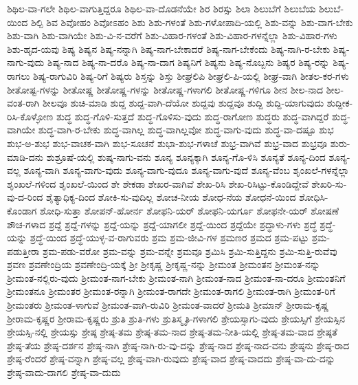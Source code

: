 {ಶಿಥಿಲ-ವಾ-ಗಲೇ
ಶಿಥಿಲ-ವಾಗುತ್ತಿದ್ದರೂ
ಶಿಥಿಲ-ವಾ-ದೊಡನೆಯೇ
ಶಿರ
ಶಿರಸ್ಸು
ಶಿಲಾ
ಶಿಲುಬೆಗೆ
ಶಿಲುಬೆಯ
ಶಿಲುಬೆ-ಯಿಂದ
ಶಿಲ್ಪಿ
ಶಿವ
ಶಿವೋಹಂ
ಶಿವೋಽಹಂ
ಶಿಶು
ಶಿಶು-ಗಳಂತೆ
ಶಿಶು-ಗಳೋಪಾದಿ-ಯಲ್ಲಿ
ಶಿಶು-ವನ್ನು
ಶಿಶು-ವಾಗ-ಬೇಕು
ಶಿಶು-ವಾಗಿ
ಶಿಶು-ವಾಗಿಯೇ
ಶಿಶು-ವಿ-ನ-ವರೆಗೆ
ಶಿಶು-ವಿಹಾರ-ಗಳಂತೆ
ಶಿಶು-ವಿಹಾರ-ಗಳನ್ನೆಲ್ಲಾ
ಶಿಶು-ವಿಹಾರ-ಗಳು
ಶಿಶು-ಹೃದ-ಯವು
ಶಿಷ್ಯ
ಶಿಷ್ಯನ
ಶಿಷ್ಯ-ನನ್ನಾಗಿ
ಶಿಷ್ಯ-ನಾಗ-ಬೇಕಾದರೆ
ಶಿಷ್ಯ-ನಾಗ-ಬೇಕೆಂದು
ಶಿಷ್ಯ-ನಾಗಿ-ರ-ಬೇಕು
ಶಿಷ್ಯ-ನಾಗು-ವುದು
ಶಿಷ್ಯ-ನಾದ
ಶಿಷ್ಯ-ನಾ-ದರೊ
ಶಿಷ್ಯ-ನಾ-ದಾಗ
ಶಿಷ್ಯನಿಗೆ
ಶಿಷ್ಯನು
ಶಿಷ್ಯ-ನೊಬ್ಬನು
ಶಿಷ್ಯರ
ಶಿಷ್ಯ-ರನ್ನು
ಶಿಷ್ಯ-ರಾಗಲು
ಶಿಷ್ಯ-ರಾಗುವಿರಿ
ಶಿಷ್ಯ-ರಿಗೆ
ಶಿಷ್ಯರು
ಶಿಸ್ತನ್ನು
ಶಿಸ್ತು
ಶೀಘ್ರಲಿಪಿ
ಶೀಘ್ರಲಿ-ಪಿ-ಯಲ್ಲಿ
ಶೀಘ್ರ-ವಾಗಿ
ಶೀತಲ-ಕರ-ಗಳು
ಶೀತೋಷ್ಟ-ಗಳನ್ನು
ಶೀತೋಷ್ಣ
ಶೀತೋಷ್ಣ-ಗಳನ್ನು
ಶೀತೋಷ್ಣ-ಗಳಾಗಲಿ
ಶೀತೋಷ್ಣ-ಗಳಿಗೂ
ಶೀನ
ಶೀಲ-ನಾದ
ಶೀಲ-ವಂತ-ರಾಗಿ
ಶೀಲವೂ
ಶುಚಿ-ಮಾಡಿ
ಶುದ್ದ
ಶುದ್ದ-ವಾಗಿ-ದೆಯೋ
ಶುದ್ದವು
ಶುದ್ದವೂ
ಶುದ್ದಿ
ಶುದ್ದಿ-ಯಾಗುವುದು
ಶುದ್ದೀಕ-ರಿಸಿ-ಕೊಳ್ಳೋಣ
ಶುದ್ಧ
ಶುದ್ಧ-ಗೊಳಿ-ಸುತ್ತದೆ
ಶುದ್ಧ-ಗೊಳಿಸು-ವುದು
ಶುದ್ಧ-ರಾಗೋಣ
ಶುದ್ಧರು
ಶುದ್ಧ-ವಾಗಿದ್ದರೆ
ಶುದ್ಧ-ವಾಗಿಯೇ
ಶುದ್ಧ-ವಾಗಿ-ರ-ಬೇಕು
ಶುದ್ಧ-ವಾಗಿಲ್ಲ
ಶುದ್ಧ-ವಾಗಿಲ್ಲವೋ
ಶುದ್ಧ-ವಾಗು-ವುದು
ಶುದ್ಧ-ವಾ-ದಷ್ಟೂ
ಶುಭ
ಶುಭ-ಅ-ಶುಭ
ಶುಭ-ವಾಚಕ-ವಾಗಿ
ಶುಭ-ಸೂಚನೆ
ಶುಭಾ-ಶುಭ-ಗಳಾಚೆ
ಶುಭ್ರ-ವಾಗಿವೆ
ಶುಭ್ರ-ವಾದ
ಶುಭ್ರವೂ
ಶುರು-ಮಾಡಿ-ದನು
ಶುಶ್ರೂಷೆ-ಯಲ್ಲಿ
ಶುಷ್ಕ-ನಾಗು-ವನು
ಶೂನ್ಯ
ಶೂನ್ಯಕ್ಕಾಗಿ
ಶೂನ್ಯ-ಗೊ-ಳಿಸಿ
ಶೂನ್ಯತೆ
ಶೂನ್ಯ-ದಿಂದ
ಶೂನ್ಯ-ವಲ್ಲ
ಶೂನ್ಯ-ವಾಗಿ
ಶೂನ್ಯ-ವಾಗು-ವುದು
ಶೂನ್ಯ-ವಾಗು-ವುದೂ
ಶೂನ್ಯ-ವಾಗು-ವುದೆ
ಶೂನ್ಯ-ವೆಂಬ
ಶೃಂಖಲೆ-ಗಳನ್ನೆಲ್ಲಾ
ಶೃಂಖಲೆ-ಗಳಿಂದ
ಶೃಂಖಲೆ-ಯಿಂದ
ಶೇ
ಶೇಕಡಾ
ಶೇಖರ-ವಾಗಿವೆ
ಶೇಖ-ರಿಸಿ
ಶೇಖ-ರಿಸಿಟ್ಟು-ಕೊಂಡಿದ್ದೇವೆ
ಶೇಖರಿ-ಸು-ವು-ದ-ರಿಂದ
ಶೈತ್ಯಾಧಿಕ್ಯ-ದಿಂದ
ಶೋಕಿ-ಸು-ವುದಿಲ್ಲ
ಶೋಚ-ನೀಯ
ಶೋಧ-ನೆಯ
ಶೋಧನೆ-ಯಿಂದ
ಶೋಧಿಸಿ-ಕೊಂಡಾಗ
ಶೋಧಿ-ಸುತ್ತಾ
ಶೋಪನ್-ಹೋರ್ನ
ಶೋಫನಿ-ಯರ್
ಶೋಫನಿ-ಯರ್ಗೂ
ಶೋಫನೇ-ಯರ್
ಶೋಷಣೆ
ಶೌಚ-ಗಳಾದ
ಶ್ರದ್ದೆ
ಶ್ರದ್ದೆ-ಗಳನ್ನು
ಶ್ರದ್ದೆ-ಯನ್ನು
ಶ್ರದ್ದೆ-ಯಾಗಲೀ
ಶ್ರದ್ದೆ-ಯಿಂದ
ಶ್ರದ್ದೆಯೇ
ಶ್ರದ್ಧಾಳು-ಗಳು
ಶ್ರದ್ಧೆ
ಶ್ರದ್ಧೆ-ಯನ್ನು
ಶ್ರದ್ಧೆ-ಯಿಂದ
ಶ್ರದ್ಧೆ-ಯುಳ್ಳ-ವ-ರಾಗುವರು
ಶ್ರಮ
ಶ್ರಮ-ಜೀವಿ-ಗಳ
ಶ್ರಮಣರ
ಶ್ರಮದ
ಶ್ರಮ-ಪಟ್ಟು
ಶ್ರಮ-ಪಡುತ್ತೀರಾ
ಶ್ರಮ-ಪಡು-ವರೋ
ಶ್ರಮ-ವನ್ನು
ಶ್ರಮ-ವನ್ನೇ
ಶ್ರಮವೂ
ಶ್ರಮಿಸಿ
ಶ್ರಮಿ-ಸುತ್ತಿದ್ದನು
ಶ್ರಮಿ-ಸುತ್ತಿ-ರುವೆವು
ಶ್ರವಣ
ಶ್ರವಣೇಂದ್ರಿಯ
ಶ್ರವಣೇಂದ್ರಿ-ಯಕ್ಕೆ
ಶ್ರೀ
ಶ್ರೀಕೃಷ್ಣ
ಶ್ರೀಕೃಷ್ಣ-ನನ್ನು
ಶ್ರೀಮಂತ
ಶ್ರೀಮಂತನ
ಶ್ರೀಮಂತ-ನನ್ನು
ಶ್ರೀಮಂತ-ನಲ್ಲಿರು-ವುದು
ಶ್ರೀಮಂತ-ನಾಗ-ಬೇಕು
ಶ್ರೀಮಂತ-ನಾಗಿ
ಶ್ರೀಮಂತ-ನಾದ
ಶ್ರೀಮಂತ-ನಾ-ದರೂ
ಶ್ರೀಮಂತನಿಗೆ
ಶ್ರೀಮಂತನೂ
ಶ್ರೀಮಂತರ
ಶ್ರೀಮಂತ-ರನ್ನಾಗಿ
ಶ್ರೀಮಂತ-ರಾಗದೇ
ಶ್ರೀಮಂತ-ರಾಗಲಿ
ಶ್ರೀಮಂತ-ರಾಗಿ
ಶ್ರೀಮಂತ-ರಿಗೆ
ಶ್ರೀಮಂತರು
ಶ್ರೀಮಂತ-ಳಾಗುವೆ
ಶ್ರೀಮಂತ-ವಾಗಿ-ರುವಿರಿ
ಶ್ರೀಮಂತ-ವಾದರೆ
ಶ್ರೀಮತಿ
ಶ್ರೀಮಾನ್
ಶ್ರೀರಾಮ-ಕೃಷ್ಣ
ಶ್ರೀರಾಮ-ಕೃಷ್ಣರ
ಶ್ರೀರಾಮ-ಕೃಷ್ಣರು
ಶ್ರುತಿ
ಶ್ರುತಿ-ಗಳು
ಶ್ರುತಿಸ್ಮೃತಿ-ಗಳಾಗಲಿ
ಶ್ರೇಯಸ್ಸಾಗು-ವುದು
ಶ್ರೇಯಸ್ಸಿಗೆ
ಶ್ರೇಯಸ್ಸಿನ
ಶ್ರೇಯಸ್ಸಿ-ನಲ್ಲಿ
ಶ್ರೇಯಸ್ಸು
ಶ್ರೇಷ್ಠ
ಶ್ರೇಷ್ಠ-ತಮ
ಶ್ರೇಷ್ಠ-ತಮ-ನಾದ
ಶ್ರೇಷ್ಠ-ತಮ-ನೀತಿ-ಯಲ್ಲಿ
ಶ್ರೇಷ್ಠ-ತಮ-ವಾದ
ಶ್ರೇಷ್ಠತೆ
ಶ್ರೇಷ್ಠ-ತೆಯ
ಶ್ರೇಷ್ಠ-ದರ್ಶನ
ಶ್ರೇಷ್ಠ-ನಾಗಿ
ಶ್ರೇಷ್ಠ-ನಾಗಿ-ರು-ವು-ದನ್ನು
ಶ್ರೇಷ್ಠ-ನಾದ
ಶ್ರೇಷ್ಠ-ನಾದ-ವನು
ಶ್ರೇಷ್ಠನು
ಶ್ರೇಷ್ಠ-ರಾದ
ಶ್ರೇಷ್ಠ-ರೆಂದರೆ
ಶ್ರೇಷ್ಠ-ವನ್ನಾಗಿ
ಶ್ರೇಷ್ಠ-ವಲ್ಲ
ಶ್ರೇಷ್ಠ-ವಾಗಿ-ರುವುದು
ಶ್ರೇಷ್ಠ-ವಾದ
ಶ್ರೇಷ್ಠ-ವಾದದು
ಶ್ರೇಷ್ಠ-ವಾ-ದು-ದನ್ನು
ಶ್ರೇಷ್ಠ-ವಾದು-ದಾಗಲಿ
ಶ್ರೇಷ್ಠ-ವಾ-ದುದು
}
